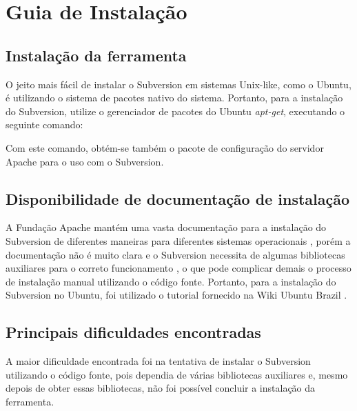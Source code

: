 \chapter[Guia de Instalação]{Guia de Instalação}

\section{Instalação da ferramenta}
    
    O jeito mais fácil de instalar o Subversion em sistemas Unix-like, como o Ubuntu,
    é utilizando o sistema de pacotes nativo do sistema. Portanto, para a instalação do Subversion,
    utilize o gerenciador de pacotes do Ubuntu \textit{apt-get}, executando o seguinte comando:
    
    \colorbox{PineGreen}{
      \begin{minipage}{0.6\linewidth}
      \end{minipage}
    }
    
    Com este comando, obtém-se também o pacote de configuração do servidor Apache para o uso com o Subversion.
  
\section{Disponibilidade de documentação de instalação}
  
  A Fundação Apache mantém uma vasta documentação para a instalação do Subversion de diferentes maneiras
  para diferentes sistemas operacionais \footnotemark, porém a documentação não é muito clara e o Subversion necessita
  de algumas bibliotecas auxiliares para o correto funcionamento \cite{svn-book}, o que pode complicar demais o processo
  de instalação manual utilizando o código fonte. Portanto, para a instalação do Subversion no Ubuntu, foi utilizado o
  tutorial fornecido na Wiki Ubuntu Brazil \footnotemark.
  
  
\section{Principais dificuldades encontradas}
  
  A maior dificuldade encontrada foi na tentativa de instalar o Subversion utilizando o código fonte, pois dependia de 
  várias bibliotecas auxiliares e, mesmo depois de obter essas bibliotecas, não foi possível concluir a instalação da
  ferramenta.
